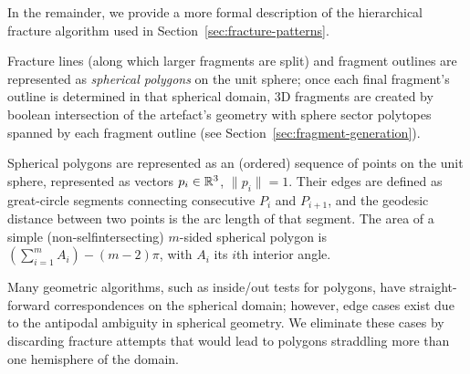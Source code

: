 \documentclass[acmlarge,screen,dvipsnames]{acmart}
\begin{document}
In the remainder, we provide a more formal description of the
hierarchical fracture algorithm used in
Section~\ref{sec:fracture-patterns}.

Fracture lines (along which larger fragments are split) and fragment
outlines are represented as \emph{spherical polygons} on the unit
sphere; once each final fragment's outline is determined in that
spherical domain, 3D fragments are created by boolean intersection of
the artefact's geometry with sphere sector polytopes spanned by
each fragment outline (see Section~\ref{sec:fragment-generation}).

Spherical polygons are represented as an (ordered) sequence of points
on the unit sphere, represented as vectors $p_i\in{\mathbb R}^3$,
$\|p_i\|=1$. Their edges are defined as great-circle segments
connecting consecutive $P_i$ and $P_{i+1}$, and the geodesic distance
between two points is the arc length of that segment. The area of a
simple (non-selfintersecting) $m$-sided spherical polygon is
$(\sum_{i=1}^m A_i) - (m-2)\pi$, with $A_i$ its $i$th interior angle.

Many geometric algorithms, such as inside/out tests for polygons, have
straight-forward correspondences on the spherical domain; however,
edge cases exist due to the antipodal ambiguity in spherical
geometry. We eliminate these cases by discarding fracture attempts
that would lead to polygons straddling more than one hemisphere of the
domain.
\end{document}
